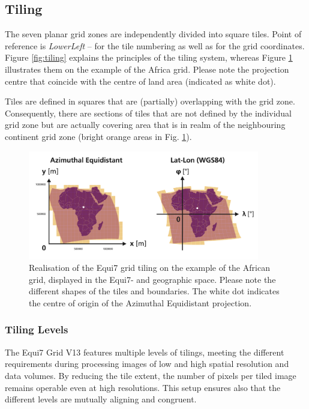 \documentclass[10pt,a4paper]{article}
\begin{document}
\newpage

\subsection{Tiling}
\label{sub:tiling}

The seven planar grid zones are independently divided into square tiles. Point of reference is \textit{LowerLeft} -- for the tile numbering as well as for the grid coordinates. Figure \ref{fig:tiling} explains the principles of the tiling system, whereas Figure \ref{fig:tiling_africa} illustrates them on the example of the Africa grid. Please note the projection centre that coincide with the centre of land area (indicated as white dot). 

Tiles are defined in squares that are (partially) overlapping with the grid zone. Consequently, there are sections of tiles that are not defined by the individual grid zone but are actually covering area that is in realm of the neighbouring continent grid zone (bright orange areas in Fig. \ref{fig:tiling_africa}).

\begin{figure}[hbtp]
\centering
\includegraphics[width=0.9\textwidth]{equi7_tiling_africa}
\caption{
Realisation of the Equi7 grid tiling on the example of the African grid, displayed in the Equi7- and geographic space. Please note the different shapes of the tiles and boundaries. The white dot indicates the centre of origin of the Azimuthal Equidistant projection.
}
\label{fig:tiling_africa}
\end{figure}

\subsubsection*{Tiling Levels}

The Equi7 Grid V13 features multiple levels of tilings, meeting the different requirements during processing images of low and high spatial resolution and data volumes. By reducing the tile extent, the number of pixels per tiled image remains operable even at high resolutions. This setup ensures also that the different levels are mutually aligning and congruent. 
\end{document}
